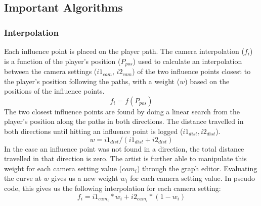 \subsection{Important Algorithms}
\subsubsection{Interpolation}

Each influence point is placed on the player path. The camera interpolation ($f_{i}$) is a function of the player's position ($P_{pos}$) used to calculate an interpolation between the camera settings ($i1_{cam}$, $i2_{cam}$) of the two influence points closest to the player's position following the paths, with a weight ($w$) based on the positions of the influence points.
\begin{equation}
f_{i} = f(P_{pos})
\end{equation}
The two closest influence points are found by doing a linear search from the player's position along the paths in both directions. The distance travelled in both directions until hitting an influence point is logged ($i1_{dist}, i2_{dist}$).
\begin{equation}
w = i1_{dist}/(i1_{dist} + i2_{dist})
\end{equation}
In the case an influence point was not found in a direction, the total distance travelled in that direction is zero. The artist is further able to manipulate this weight for each camera setting value ($cam_{i}$) through the graph editor. Evaluating the curve at $w$ gives us a new weight $w_{i}$ for each camera setting value. In pseudo code, this gives us the following interpolation for each camera setting:
\begin{equation}
f_{i} = i1_{cam_{i}} * w_{i} + i2_{cam_{i}} * (1-w_{i})
\end{equation}
